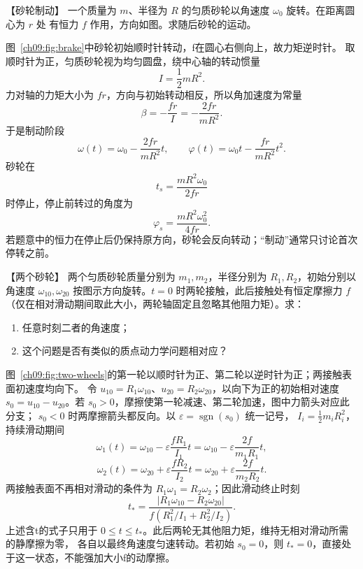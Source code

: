 {
\begin{origexamplebox}{【砂轮制动】}\label{ch09:ex:s17-15-1}
一个质量为 $m$、半径为 $R$ 的匀质砂轮以角速度 $\omega_0$ 旋转。在距离圆心为 $r$ 处
有恒力 $f$ 作用，方向如图。求随后砂轮的运动。


\ThQBrakingWheel
\end{origexamplebox}

\begin{xesolution}
\brakeWheelDiagram

图~\ref{ch09:fig:brake}中砂轮初始顺时针转动，f在圆心右侧向上，故力矩逆时针。
取顺时针为正，匀质砂轮视为均匀圆盘，绕中心轴的转动惯量
\[
 I=\frac12mR^2.
\]
力对轴的力矩大小为 $fr$，方向与初始转动相反，所以角加速度为常量
\[
 \beta=-\frac{fr}{I}=-\frac{2fr}{mR^2}.
\]
于是制动阶段
\[
 \boxed{\omega(t)=\omega_0-\frac{2fr}{mR^2}t},
 \qquad
 \boxed{\varphi(t)=\omega_0t-\frac{fr}{mR^2}t^2}.
\]
砂轮在
\[
 \boxed{t_s=\frac{mR^2\omega_0}{2fr}}
\]
时停止，停止前转过的角度为
\[
 \boxed{\varphi_s=\frac{mR^2\omega_0^2}{4fr}}.
\]
若题意中的恒力在停止后仍保持原方向，砂轮会反向转动；“制动”通常只讨论首次停转之前。
\end{xesolution}

\begin{origexamplebox}{【两个砂轮】}\label{ch09:ex:s17-15-2}
两个匀质砂轮质量分别为 $m_1,m_2$，半径分别为 $R_1,R_2$，初始分别以角速度
$\omega_{10},\omega_{20}$ 按图示方向旋转。$t=0$ 时两轮接触，此后接触处有恒定摩擦力
$f$（仅在相对滑动期间取此大小，两轮轴固定且忽略其他阻力矩）。求：
\begin{enumerate}[label=(\arabic*),leftmargin=2.2em]
  \item 任意时刻二者的角速度；
  \item 这个问题是否有类似的质点动力学问题相对应？
\end{enumerate}


\ThQWheels
\end{origexamplebox}

\begin{xesolution}
\twoWheelsDiagram

图~\ref{ch09:fig:two-wheels}的第一轮以顺时针为正、第二轮以逆时针为正；两接触表面初速度均向下。
令 $u_{10}=R_1\omega_{10}$、$u_{20}=R_2\omega_{20}$，以向下为正的初始相对速度
$s_0=u_{10}-u_{20}$。若 $s_0>0$，摩擦使第一轮减速、第二轮加速，图中力箭头对应此分支；
$s_0<0$ 时两摩擦箭头都反向。以 $\varepsilon=\operatorname{sgn}(s_0)$ 统一记号，
$I_i=\tfrac12m_iR_i^2$，持续滑动期间
\[
 \boxed{\omega_1(t)=\omega_{10}-\varepsilon\frac{fR_1}{I_1}t
 =\omega_{10}-\varepsilon\frac{2f}{m_1R_1}t},
\]
\[
 \boxed{\omega_2(t)=\omega_{20}+\varepsilon\frac{fR_2}{I_2}t
 =\omega_{20}+\varepsilon\frac{2f}{m_2R_2}t}.
\]
两接触表面不再相对滑动的条件为 $R_1\omega_1=R_2\omega_2$；因此滑动终止时刻
\[
 \boxed{t_*=
 \frac{|R_1\omega_{10}-R_2\omega_{20}|}
 {f(R_1^2/I_1+R_2^2/I_2)}}.
\]
上述含t的式子只用于 $0\le t\le t_*$。此后两轮无其他阻力矩，维持无相对滑动所需的静摩擦为零，
各自以最终角速度匀速转动。若初始 $s_0=0$，则 $t_*=0$，直接处于这一状态，不能强加大小f的动摩擦。


\end{xesolution}}
